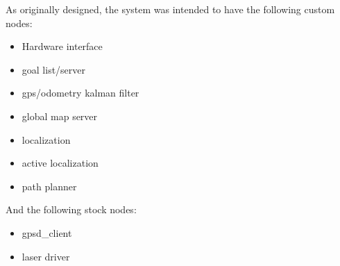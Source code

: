 As originally designed, the system was intended to have the following custom nodes:
\begin{itemize}
   \item Hardware interface
   \item goal list/server
   \item gps/odometry kalman filter
   \item global map server
   \item localization
   \item active localization
   \item path planner
\end{itemize}
And the following stock nodes:
\begin{itemize}
   \item gpsd\_client
   \item laser driver
\end{itemize}


